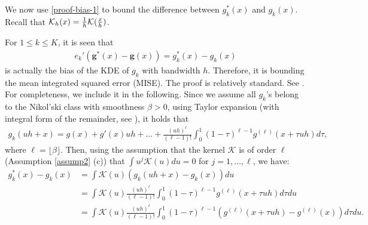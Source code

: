\documentclass[preprint,11pt]{article}
\newcommand{\mcal}{\mathcal}
\newcommand{\zy}[1]{{\color{red}\bf[ZY: #1]}}
\numberwithin{equation}{section}
\newcommand{\beq}{\begin{equation}}
\newcommand{\eeq}{\end{equation}}
\begin{document}
We now use \eqref{proof-bias-1} to bound the difference between $g_k^*(x)$ and $g_k(x)$. Recall that ${\cal K}_h(x) = \frac{1}{h}{\cal K}(\frac{x}{h})$. 

For $1\le k\le K$, it is seen that
\begin{align*}
    e_k'({\boldsymbol g}^*(x)-{\boldsymbol g}(x))=g_k^*(x)-g_k(x)
\end{align*}
is actually the bias of the KDE of $g_k$ with bandwidth $h$. Therefore, it is bounding the mean integrated squared error (MISE). The proof is relatively standard. See \cite[Proposition 5.1]{tsybakov2009introduction}. For completeness, we include it in the following. Since we assume all $g_k$'s belong to the Nikol’ski class with smoothness $\beta>0$, using Taylor expansion (with integral form of the remainder, see \cite{apostol1991calculus}), it holds that
\begin{align*}
    g_k(uh+x)=g(x)+g'(x)uh+\ldots+\frac{(uh)^{\ell}}{(\ell-1)!}\int_{0}^{1}(1-\tau)^{\ell-1}g^{(\ell)}(x+\tau uh)d\tau,
\end{align*}
where $\ell=\lfloor \beta \rfloor$. Then, using the assumption that the kernel $\mcal{K}$ is of order $\ell$ (Assumption \ref{assump2} (c)) that $\int u^j\mcal{K}(u)du=0$ for $j=1,\ldots,\ell$, we have:
\begin{align*}
    g_k^*(x)-g_k(x)&=\int \mcal{K}(u)(g_k(uh+x)-g_k(x))du\\
    &=\int \mcal{K}(u)\frac{(uh)^{\ell}}{(\ell-1)!}\int_{0}^{1}(1-\tau)^{\ell-1}g^{(\ell)}(x+\tau uh)d\tau du\\
    &=\int \mcal{K}(u)\frac{(uh)^{\ell}}{(\ell-1)!}\int_{0}^{1}(1-\tau)^{\ell-1}(g^{(\ell)}(x+\tau uh)-g^{(\ell)}(x))d\tau du.
\end{align*}
\end{document}
